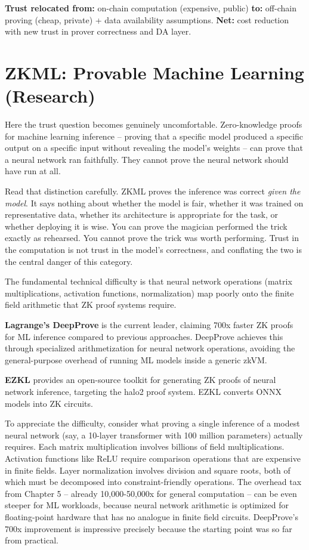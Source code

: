 \documentclass[
  11pt,
  openany]{report}
\renewcommand{\textbf}[1]{{\bfseries\color{MidnightBold}#1}}
\begin{document}
\textbf{Trust relocated from:} on-chain computation (expensive, public)
\textbf{to:} off-chain proving (cheap, private) + data availability assumptions.
\textbf{Net:} cost reduction with new trust in prover correctness and DA layer.

\section{ZKML: Provable Machine Learning
(Research)}\label{zkml-provable-machine-learning-research}

Here the trust question becomes genuinely uncomfortable. Zero-knowledge proofs
for machine learning inference -- proving that a specific model produced a
specific output on a specific input without revealing the model's weights -- can
prove that a neural network ran faithfully. They cannot prove the neural network
should have run at all.

Read that distinction carefully. ZKML proves the inference was correct
\emph{given the model}. It says nothing about whether the model is fair, whether
it was trained on representative data, whether its architecture is appropriate
for the task, or whether deploying it is wise. You can prove the magician
performed the trick exactly as rehearsed. You cannot prove the trick was worth
performing. Trust in the computation is not trust in the model's correctness,
and conflating the two is the central danger of this category.

The fundamental technical difficulty is that neural network operations (matrix
multiplications, activation functions, normalization) map poorly onto the finite
field arithmetic that ZK proof systems require.

\textbf{Lagrange's DeepProve} is the current leader, claiming 700x faster ZK
proofs for ML inference compared to previous approaches. DeepProve achieves this
through specialized arithmetization for neural network operations, avoiding the
general-purpose overhead of running ML models inside a generic zkVM.

\textbf{EZKL} provides an open-source toolkit for generating ZK proofs of neural
network inference, targeting the halo2 proof system. EZKL converts ONNX models
into ZK circuits.

To appreciate the difficulty, consider what proving a single inference of a
modest neural network (say, a 10-layer transformer with 100 million parameters)
actually requires. Each matrix multiplication involves billions of field
multiplications. Activation functions like ReLU require comparison operations
that are expensive in finite fields. Layer normalization involves division and
square roots, both of which must be decomposed into constraint-friendly
operations. The overhead tax from Chapter 5 -- already 10,000-50,000x for
general computation -- can be even steeper for ML workloads, because neural
network arithmetic is optimized for floating-point hardware that has no analogue
in finite field circuits. DeepProve's 700x improvement is impressive precisely
because the starting point was so far from practical.
\end{document}
